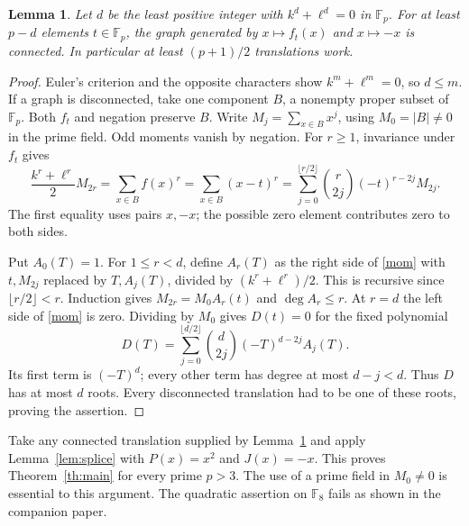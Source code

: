 \documentclass[11pt]{article}
\newtheorem{lemma}[theorem]{Lemma}
\newcommand{\F}{\mathbb F}
\begin{document}
\begin{lemma}\label{lem:moment}
Let $d$ be the least positive integer with $k^d+\ell^d=0$ in $\F_p$. For at least $p-d$ elements $t\in\F_p$, the graph generated by $x\mapsto f_t(x)$ and $x\mapsto-x$ is connected. In particular at least $(p+1)/2$ translations work.
\end{lemma}
\begin{proof}
Euler's criterion and the opposite characters show $k^m+\ell^m=0$, so $d\le m$. If a graph is disconnected, take one component $B$, a nonempty proper subset of $\F_p$. Both $f_t$ and negation preserve $B$. Write $M_j=\sum_{x\in B}x^j$, using $M_0=|B|\ne0$ in the prime field. Odd moments vanish by negation. For $r\ge1$, invariance under $f_t$ gives
\begin{equation}\label{mom}
 \frac{k^r+\ell^r}{2}M_{2r}
 =\sum_{x\in B} f(x)^r
 =\sum_{x\in B}(x-t)^r
 =\sum_{j=0}^{\lfloor r/2\rfloor}\binom r{2j}(-t)^{r-2j}M_{2j}.
\end{equation}
The first equality uses pairs $x,-x$; the possible zero element contributes zero to both sides.

Put $A_0(T)=1$. For $1\le r<d$, define $A_r(T)$ as the right side of \eqref{mom} with $t,M_{2j}$ replaced by $T,A_j(T)$, divided by $(k^r+\ell^r)/2$. This is recursive since $\lfloor r/2\rfloor<r$. Induction gives $M_{2r}=M_0 A_r(t)$ and $\deg A_r\le r$. At $r=d$ the left side of \eqref{mom} is zero. Dividing by $M_0$ gives $D(t)=0$ for the fixed polynomial
\[
 D(T)=\sum_{j=0}^{\lfloor d/2\rfloor}\binom d{2j}(-T)^{d-2j}A_j(T).
\]
Its first term is $(-T)^d$; every other term has degree at most $d-j<d$. Thus $D$ has at most $d$ roots. Every disconnected translation had to be one of these roots, proving the assertion.
\end{proof}

Take any connected translation supplied by Lemma~\ref{lem:moment} and apply Lemma~\ref{lem:splice} with $P(x)=x^2$ and $J(x)=-x$. This proves Theorem~\ref{th:main} for every prime $p>3$. The use of a prime field in $M_0\ne0$ is essential to this argument. The quadratic assertion on $\F_8$ fails as shown in the companion paper.
\end{document}
